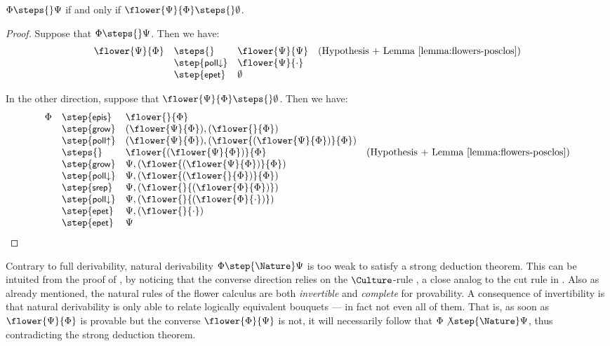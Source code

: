 \begin{theorem}
  $\Phi \steps{} \Psi$ if and only if $\flower{\Psi}{\Phi} \steps{} \emptyset$.
\end{theorem}
\begin{proof}
  Suppose that $\Phi \steps{} \Psi$. Then we have:
  $$
  \begin{array}{rlll}
    \flower{\Psi}{\Phi}
    &\steps{} &\flower{\Psi}{\Psi} &\text{(Hypothesis + \reflemma{flowers-posclos})}\\
    &\step{\rsf{poll{\da}}} &\flower{\Psi}{\cdot} &\\
    &\step{\rsf{epet}} &\emptyset &
  \end{array}
  $$
  
  In the other direction, suppose that $\flower{\Psi}{\Phi} \steps{} \emptyset$.
  Then we have:
  $$
  \begin{array}{rlll}
    \Phi
    &\step{\rsf{epis}} &\flower{}{\Phi} &\\
    &\step{\rsf{grow}} &(\flower{\Psi}{\Phi}),(\flower{}{\Phi}) &\\
    &\step{\rsf{poll{\ua}}} &(\flower{\Psi}{\Phi}),(\flower{(\flower{\Psi}{\Phi})}{\Phi}) &\\
    &\steps{} &\flower{(\flower{\Psi}{\Phi})}{\Phi} &\text{(Hypothesis + \reflemma{flowers-posclos})}\\
    &\step{\rsf{grow}} &\Psi,(\flower{(\flower{\Psi}{\Phi})}{\Phi}) &\\
    &\step{\rsf{poll{\da}}} &\Psi,(\flower{(\flower{}{\Phi})}{\Phi}) &\\
    &\step{\rsf{srep}} &\Psi,(\flower{}{(\flower{\Phi}{\Phi})}) &\\
    &\step{\rsf{poll{\da}}} &\Psi,(\flower{}{(\flower{\Phi}{\cdot})}) &\\
    &\step{\rsf{epet}} &\Psi,(\flower{}{\cdot}) &\\
    &\step{\rsf{epet}} &\Psi
  \end{array}
  $$
\end{proof}

Contrary to full derivability, natural derivability $\Phi \step{\Nature} \Psi$
is too weak to satisfy a strong deduction theorem. This can be intuited from the
proof of , by noticing that the converse
direction relies on the $\Culture$-rule , a close analog to the cut
rule in . Also as already mentioned, the natural rules of the
flower calculus are both \emph{invertible} and \emph{complete} for provability.
A consequence of invertibility is that natural derivability is only able to
relate logically equivalent bouquets --- in fact not even all of them. That is,
as soon as $\flower{\Psi}{\Phi}$ is provable but the converse
$\flower{\Phi}{\Psi}$ is not, it will necessarily follow that $\Phi
\not\step{\Nature} \Psi$, thus contradicting the strong deduction theorem.

